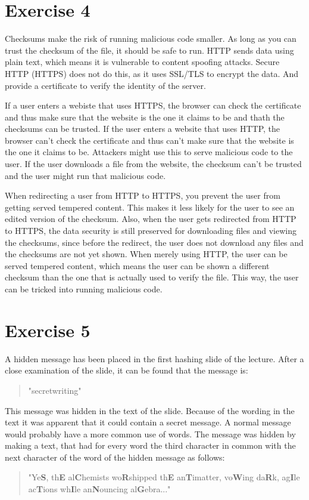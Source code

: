 \documentclass[twoside, a4paper, fleqn, reqno]{article}
\begin{document}
\section*{Exercise 4}
Checksums make the risk of running malicious code smaller. 
As long as you can trust the checksum of the file, it should be safe to run.
HTTP sends data using plain text, which means it is vulnerable to content spoofing attacks.
Secure HTTP (HTTPS) does not do this, as it uses SSL/TLS to encrypt the data.
And provide a certificate to verify the identity of the server.
\par If a user enters a webiste that uses HTTPS, the browser can check the certificate
and thus make sure that the website is the one it claims to be and thath the checksums can be trusted.
If the user enters a website that uses HTTP, the browser can't check the certificate and thus can't
make sure that the website is the one it claims to be. Attackers might use this to serve
malicious code to the user. If the user downloads a file from the website, the checksum can't be
trusted and the user might run that malicious code.
\par When redirecting a user from HTTP to HTTPS, you prevent the user from getting served
tempered content. This makes it less likely for the user to see an edited version of the
checksum. Also, when the user gets redirected from HTTP to HTTPS, the data security is still
preserved for downloading files and viewing the checksums, since before the redirect,
the user does not download any files and the checksums are not yet shown.
When merely using HTTP, the user can be served tempered content, which means the user
can be shown a different checksum than the one that is actually used to verify the file.
This way, the user can be tricked into running malicious code.

\section*{Exercise 5}
A hidden message has been placed in the first hashing slide of the lecture.
After a close examination of the slide, it can be found that the message is:
\begin{quote}
	"secretwriting"
\end{quote}
This message was hidden in the text of the slide. Because of the wording in the text
it was apparent that it could contain a secret message. A normal message would
probably have a more common use of words. The message was hidden by
making a text, that had for every word the third character in common with the next
character of the word of the hidden message as follows:
\begin{quote}
	"Ye\textbf{S}, th\textbf{E} al\textbf{C}hemists wo\textbf{R}shipped th\textbf{E}
	an\textbf{T}imatter, vo\textbf{W}ing da\textbf{R}k, 
	ag\textbf{I}le ac\textbf{T}ions wh\textbf{I}le an\textbf{N}ouncing al\textbf{G}ebra..."
\end{quote}
		
\end{document}
